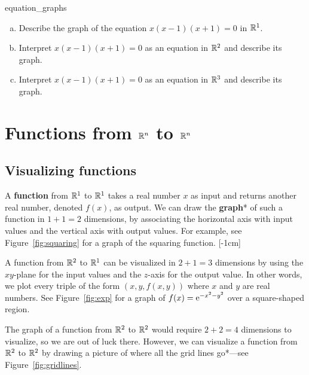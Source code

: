 \documentclass{watsonbook}
\begin{document}
\begin{exercise}{}{equation_graphs}
  \begin{enumerate}[(a), leftmargin = 12pt, itemsep = 4pt]
  \item Describe the graph of the equation $x(x-1)(x+1) = 0$ in
    $\mathbb{R}^1$. 
  \item Interpret $x(x-1)(x+1) = 0$ as an equation in $\mathbb{R}^2$ and
    describe its graph. 
  \item Interpret $x(x-1)(x+1) = 0$ as an equation in $\mathbb{R}^3$ and
    describe its graph.
  \end{enumerate}
\end{exercise}


\section{Functions from $\mathbb{R}^n$ to $\mathbb{R}^n$} \label{sec:RntoRn}

\subsection{Visualizing functions}

A \textbf{function} from $\mathbb{R}^1$ to $\mathbb{R}^1$ takes a real number $x$ as
input and returns another real number, denoted $f(x)$, as output. We
can draw the \textbf{graph}* of such a function in $1 + 1 = 2$
dimensions, by associating the horizontal axis with input values and
the vertical axis with output values. For example, see
Figure~\ref{fig:squaring} for a graph of the squaring
function. [-1cm]

A function from $\mathbb{R}^2$ to $\mathbb{R}^1$ can be visualized in $2 + 1 = 3$
dimensions by using the $xy$-plane for the input values and the
$z$-axis for the output value. In other words, we plot every triple of
the form $(x,y,f(x,y))$ where $x$ and $y$ are real numbers. See
Figure~\ref{fig:exp} for a graph of $f(x) = \operatorname{e}^{-x^2 - y^2}$ over a
square-shaped region.

The graph of a function from $\mathbb{R}^2$ to $\mathbb{R}^2$ would require
$2 + 2 = 4$ dimensions to visualize, so we are out of luck
there. However, we can visualize a function from $\mathbb{R}^2$ to $\mathbb{R}^2$ by
drawing a picture of where all the grid lines go*---see
Figure~\ref{fig:gridlines}.
\end{document}
